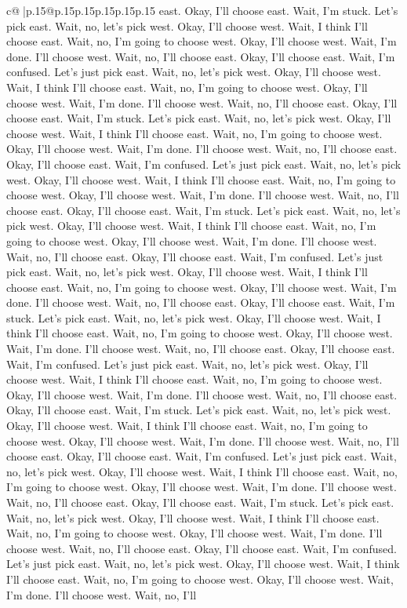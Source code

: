 \documentclass{article}
\begin{document}
{\begin{supertabular}{c@{$\;$}|p{.15\linewidth}@{}p{.15\linewidth}p{.15\linewidth}p{.15\linewidth}p{.15\linewidth}p{.15\linewidth}}
{{{east. Okay, I'll choose east. Wait, I'm stuck. Let's pick east. Wait, no, let's pick west. Okay, I'll choose west. Wait, I think I'll choose east. Wait, no, I'm going to choose west. Okay, I'll choose west. Wait, I'm done. I'll choose west. Wait, no, I'll choose east. Okay, I'll choose east. Wait, I'm confused. Let's just pick east. Wait, no, let's pick west. Okay, I'll choose west. Wait, I think I'll choose east. Wait, no, I'm going to choose west. Okay, I'll choose west. Wait, I'm done. I'll choose west. Wait, no, I'll choose east. Okay, I'll choose east. Wait, I'm stuck. Let's pick east. Wait, no, let's pick west. Okay, I'll choose west. Wait, I think I'll choose east. Wait, no, I'm going to choose west. Okay, I'll choose west. Wait, I'm done. I'll choose west. Wait, no, I'll choose east. Okay, I'll choose east. Wait, I'm confused. Let's just pick east. Wait, no, let's pick west. Okay, I'll choose west. Wait, I think I'll choose east. Wait, no, I'm going to choose west. Okay, I'll choose west. Wait, I'm done. I'll choose west. Wait, no, I'll choose east. Okay, I'll choose east. Wait, I'm stuck. Let's pick east. Wait, no, let's pick west. Okay, I'll choose west. Wait, I think I'll choose east. Wait, no, I'm going to choose west. Okay, I'll choose west. Wait, I'm done. I'll choose west. Wait, no, I'll choose east. Okay, I'll choose east. Wait, I'm confused. Let's just pick east. Wait, no, let's pick west. Okay, I'll choose west. Wait, I think I'll choose east. Wait, no, I'm going to choose west. Okay, I'll choose west. Wait, I'm done. I'll choose west. Wait, no, I'll choose east. Okay, I'll choose east. Wait, I'm stuck. Let's pick east. Wait, no, let's pick west. Okay, I'll choose west. Wait, I think I'll choose east. Wait, no, I'm going to choose west. Okay, I'll choose west. Wait, I'm done. I'll choose west. Wait, no, I'll choose east. Okay, I'll choose east. Wait, I'm confused. Let's just pick east. Wait, no, let's pick west. Okay, I'll choose west. Wait, I think I'll choose east. Wait, no, I'm going to choose west. Okay, I'll choose west. Wait, I'm done. I'll choose west. Wait, no, I'll choose east. Okay, I'll choose east. Wait, I'm stuck. Let's pick east. Wait, no, let's pick west. Okay, I'll choose west. Wait, I think I'll choose east. Wait, no, I'm going to choose west. Okay, I'll choose west. Wait, I'm done. I'll choose west. Wait, no, I'll choose east. Okay, I'll choose east. Wait, I'm confused. Let's just pick east. Wait, no, let's pick west. Okay, I'll choose west. Wait, I think I'll choose east. Wait, no, I'm going to choose west. Okay, I'll choose west. Wait, I'm done. I'll choose west. Wait, no, I'll choose east. Okay, I'll choose east. Wait, I'm stuck. Let's pick east. Wait, no, let's pick west. Okay, I'll choose west. Wait, I think I'll choose east. Wait, no, I'm going to choose west. Okay, I'll choose west. Wait, I'm done. I'll choose west. Wait, no, I'll choose east. Okay, I'll choose east. Wait, I'm confused. Let's just pick east. Wait, no, let's pick west. Okay, I'll choose west. Wait, I think I'll choose east. Wait, no, I'm going to choose west. Okay, I'll choose west. Wait, I'm done. I'll choose west. Wait, no, I'll }}}
\end{supertabular}}
\end{document}
